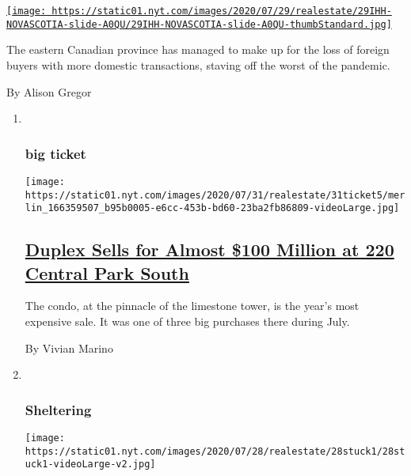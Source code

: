 \begin{enumerate}
\begin{enumerate}
    \href{/2020/07/29/realestate/house-hunting-in-nova-scotia-a-sprawling-seaside-villa-for-2-million.html}{\texttt{[image: https://static01.nyt.com/images/2020/07/29/realestate/29IHH-NOVASCOTIA-slide-A0QU/29IHH-NOVASCOTIA-slide-A0QU-thumbStandard.jpg]}}

    The eastern Canadian province has managed to make up for the loss of
    foreign buyers with more domestic transactions, staving off the
    worst of the pandemic.

    By Alison Gregor
  \end{enumerate}
\end{enumerate}

\begin{enumerate}
\def\labelenumi{\arabic{enumi}.}
\item ~
  \hypertarget{big-ticket}{%
  \subsubsection{big ticket}\label{big-ticket}}

  \texttt{[image: https://static01.nyt.com/images/2020/07/31/realestate/31ticket5/merlin\_166359507\_b95b0005-e6cc-453b-bd60-23ba2fb86809-videoLarge.jpg]}

  \hypertarget{duplex-sells-for-almost-100-million-at-220-central-park-south}{%
  \subsection{\texorpdfstring{\href{/2020/07/28/realestate/duplex-sells-for-almost-100-million-at-220-central-park-south.html}{Duplex
  Sells for Almost \$100 Million at 220 Central Park
  South}}{Duplex Sells for Almost \$100 Million at 220 Central Park South}}\label{duplex-sells-for-almost-100-million-at-220-central-park-south}}

  The condo, at the pinnacle of the limestone tower, is the year's most
  expensive sale. It was one of three big purchases there during July.

  By Vivian Marino
\item ~
  \hypertarget{sheltering}{%
  \subsubsection{Sheltering}\label{sheltering}}

  \texttt{[image: https://static01.nyt.com/images/2020/07/28/realestate/28stuck1/28stuck1-videoLarge-v2.jpg]}

  \hypertarget{making-a-move-during-the-pandemic-not-so-fast}{%
}
\end{enumerate}
